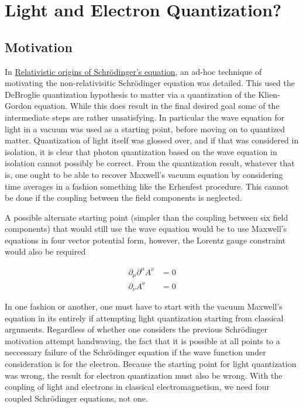 

\chapter{Light and Electron Quantization?}
\label{chap:lightQuantize}
\date{July 2, 2009}


\beginArtWithToc

\section{Motivation}

In \href{http://sites.google.com/site/peeterjoot/math2009/relwave.pdf}{Relativistic origins of Schr\"odinger's equation}, an ad-hoc technique of motivating the non-relativisitic Schr\"odinger equation was detailed.  This used the DeBroglie quantization hypothesis to matter via a quantization of the Klien-Gordon equation.  While this  does result in the final desired goal some of the intermediate steps are rather unsatisfying.  In particular the wave equation for light in a vacuum was used as a starting point, before moving on to quantized matter.  Quantization of light itself was glossed over, and if that was considered in isolation, it is clear that photon quantization based on the wave equation in isolation cannot possibly be correct.  From the quantization result, whatever that is, one ought to be able to recover Maxwell's vacuum equation by considering time averages in a fashion something like the Erhenfest procedure.  This cannot be done if the coupling between the field components is neglected.

A possible alternate starting point (simpler than the coupling between six field components) that would still use the wave equation would be to use Maxwell's equations in four vector potential form, however, the Lorentz gauge constraint would also be required

\begin{align}\label{eqn:maxwellPotVacuum}
\partial_\mu \partial^\mu A^\nu &= 0 \\
\partial_\nu A^\nu &= 0
\end{align}

In one fashion or another, one must have to start with the vacuum Maxwell's equation in its entirely if attempting light quantization starting from classical arguments.  Regardless of whether one considers the previous Schr\"odinger motivation attempt handwaving, the fact that it is possible at all points to a neccessary failure of the Schr\"odinger equation if the wave function under consideration is for the electron.  Because the starting point for light quantization was wrong, the result for electron quantization must also be wrong.  With the coupling of light and electrons in classical electromagnetism, we need four coupled Schr\"odinger equations, not one.

